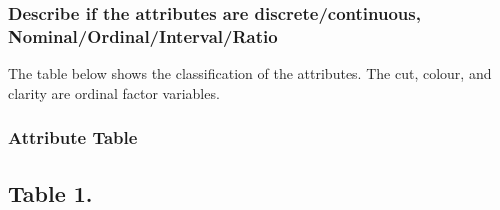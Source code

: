 \documentclass[
]{article}
\begin{document}
\hypertarget{describe-if-the-attributes-are-discretecontinuous-nominalordinalintervalratio}{%
\subsubsection{Describe if the attributes are discrete/continuous,
Nominal/Ordinal/Interval/Ratio}\label{describe-if-the-attributes-are-discretecontinuous-nominalordinalintervalratio}}

The table below shows the classification of the attributes. The cut,
colour, and clarity are ordinal factor variables.

\hypertarget{attribute-table}{%
\subsubsection{Attribute Table}\label{attribute-table}}

\hypertarget{table-1.}{%
\subsection{Table 1.}\label{table-1.}}
\end{document}
